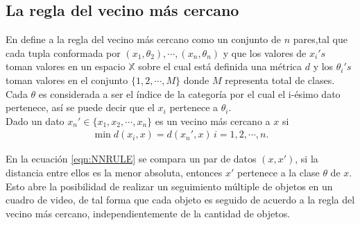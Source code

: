 \subsection{La regla del vecino más cercano}

En \citet{T.M.COVER2012} define a la regla del vecino más cercano como un conjunto de $n$ pares,tal que cada tupla conformada por  $(x_1,\theta_2),\cdots ,(x_n,\theta_n)$ y que los valores de $x_i's$ toman valores en un espacio $\mathbb{X}$ sobre el cual está definida una métrica $d$ y los $\theta_i's$ toman valores en el conjunto $\{1,2, \cdots  ,M\}$ donde $M$ representa total de clases. Cada $\theta$ es considerada a ser el índice de la categoría por el cual el i-ésimo dato pertenece, así se puede decir que el $x_i$ pertenece a $\theta_i$.\\
Dado un dato $x_n' \in \{x_1, x_2, \cdots, x_n\}$ es un vecino más cercano a $x$ si
\begin{equation}
    \begin{aligned}
        \min{d(x_i,x)} = d(x_n',x) \hspace{2pt} i=1,2,\cdots,n.
    \end{aligned}
    \label{eqn:NNRULE}
\end{equation}

En la ecuación \ref{eqn:NNRULE} se compara un par de datos $(x,x')$, si la distancia entre ellos es la menor absoluta, entonces $x'$ pertenece a la clase $\theta$ de $x$. Esto abre la posibilidad de realizar un seguimiento múltiple de objetos en un cuadro de video, de tal forma que cada objeto es seguido de acuerdo a la regla del vecino más cercano, independientemente de la cantidad de objetos.

